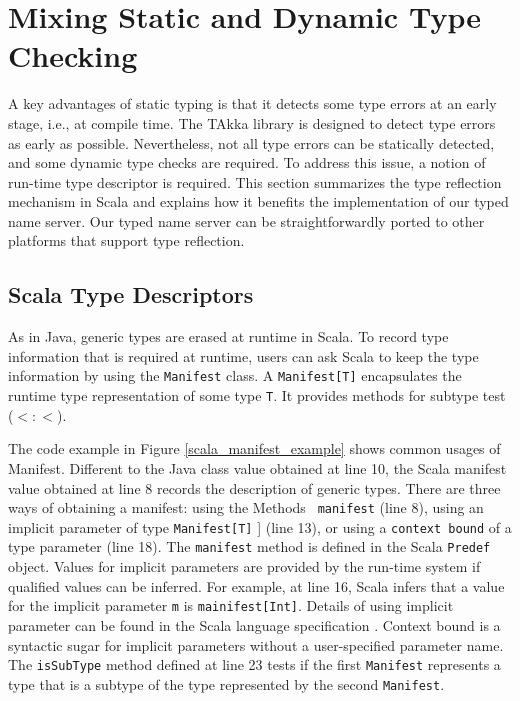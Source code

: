 \section{Mixing Static and Dynamic Type Checking}
\label{type_checking}
A key advantages of static typing is that it detects some type errors at an 
early stage, i.e., at compile time.  The TAkka library is designed to detect 
type errors as early as possible.  Nevertheless, not all type errors can be 
statically detected, and some dynamic type checks are required. To address this 
issue, a notion of run-time type descriptor is required.  This section 
summarizes the type reflection mechanism in Scala and  explains
how it benefits the implementation of our typed name
server.  Our typed name server can be straightforwardly ported
to other platforms that support type reflection.

\subsection{Scala Type Descriptors}

As in Java, generic types are erased at runtime in Scala.
To record type information that is required at runtime, users can ask Scala to 
keep the type information by using the {\tt Manifest} class.  
A {\tt Manifest[T]} encapsulates the runtime type representation 
of some type {\tt T}.  It provides methods for subtype test ($<:<$).

The code example in Figure \ref{scala_manifest_example} shows common usages of 
Manifest.  Different to the Java class value obtained at line 10, the Scala manifest
value obtained at line 8 records the description of generic types.  
There are three ways of obtaining a manifest: using the Methods {\tt 
manifest} (line 8), using an implicit parameter of type {\tt Manifest[T]} ]
(line 13), or using a {\tt context bound} of a type parameter (line 18).  
The {\tt manifest} method is defined in the Scala 
{\tt Predef} object.  Values for implicit parameters are provided by 
the run-time system if qualified values can be inferred.  For example, at line 16,
Scala infers that a value for the implicit parameter {\tt m} is {\tt mainifest[Int]}.  
Details of using implicit parameter can be found in the Scala language 
specification \citep{scala_specification}.  Context bound is a syntactic sugar for implicit parameters without a 
user-specified parameter name.  
The {\tt isSubType} method defined at line 23
tests if the first {\tt Manifest} represents a type that is a subtype of the 
type represented by the second {\tt Manifest}.

